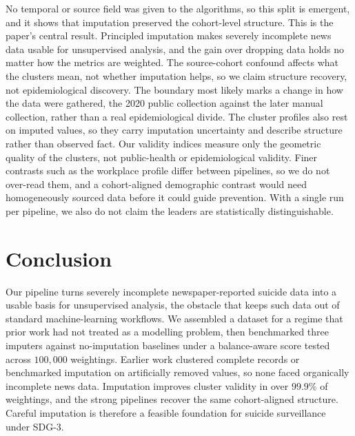 \documentclass[conference]{IEEEtran}
\begin{document}
No temporal or source field was given to the algorithms, so this split is emergent, and it shows that imputation preserved the cohort-level structure. This is the paper's central result. Principled imputation makes severely incomplete news data usable for unsupervised analysis, and the gain over dropping data holds no matter how the metrics are weighted. The source-cohort confound affects what the clusters mean, not whether imputation helps, so we claim structure recovery, not epidemiological discovery. The boundary most likely marks a change in how the data were gathered, the 2020 public collection against the later manual collection, rather than a real epidemiological divide. The cluster profiles also rest on imputed values, so they carry imputation uncertainty and describe structure rather than observed fact. Our validity indices measure only the geometric quality of the clusters, not public-health or epidemiological validity. Finer contrasts such as the workplace profile differ between pipelines, so we do not over-read them, and a cohort-aligned demographic contrast would need homogeneously sourced data before it could guide prevention. With a single run per pipeline, we also do not claim the leaders are statistically distinguishable.


\section{Conclusion}
\label{sec:conclusion}\label{sec:limitation}
Our pipeline turns severely incomplete newspaper-reported suicide data into a usable basis for unsupervised analysis, the obstacle that keeps such data out of standard machine-learning workflows. We assembled a dataset for a regime that prior work had not treated as a modelling problem, then benchmarked three imputers against no-imputation baselines under a balance-aware score tested across $100{,}000$ weightings. Earlier work clustered complete records or benchmarked imputation on artificially removed values, so none faced organically incomplete news data. Imputation improves cluster validity in over $99.9\%$ of weightings, and the strong pipelines recover the same cohort-aligned structure. Careful imputation is therefore a feasible foundation for suicide surveillance under SDG-3.
\end{document}

